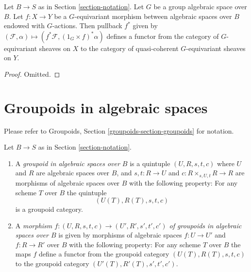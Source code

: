 \begin{lemma}
\label{lemma-pullback-equivariant}
Let $B \to S$ as in Section \ref{section-notation}.
Let $G$ be a group algebraic space over $B$.
Let $f : X \to Y$ be a $G$-equivariant morphism between
algebraic spaces over $B$ endowed with $G$-actions.
Then pullback $f^*$ given by
$(\mathcal{F}, \alpha) \mapsto (f^*\mathcal{F}, (1_G \times f)^*\alpha)$
defines a functor from the category of $G$-equivariant sheaves on
$X$ to the category of quasi-coherent $G$-equivariant sheaves on $Y$.
\end{lemma}

\begin{proof}
Omitted.
\end{proof}





\section{Groupoids in algebraic spaces}
\label{section-groupoids}

\noindent
Please refer to
Groupoids, Section \ref{groupoids-section-groupoids}
for notation.

\begin{definition}
\label{definition-groupoid}
Let $B \to S$ as in Section \ref{section-notation}.
\begin{enumerate}
\item A {\it groupoid in algebraic spaces over $B$} is a
quintuple $(U, R, s, t, c)$ where
$U$ and $R$ are algebraic spaces over $B$, and
$s, t : R \to U$ and $c : R \times_{s, U, t} R \to R$
are morphisms of algebraic spaces over $B$ with the
following property: For any scheme $T$ over $B$ the quintuple
$$
(U(T), R(T), s, t, c)
$$
is a groupoid category.
\item A {\it morphism
$f : (U, R, s, t, c) \to (U', R', s', t', c')$
of groupoids in algebraic spaces over $B$} is given by morphisms
of algebraic spaces $f : U \to U'$ and $f : R \to R'$ over $B$
with the following property:  For any scheme
$T$ over $B$ the maps $f$ define a functor from the
groupoid category $(U(T), R(T), s, t, c)$ to the
groupoid category $(U'(T), R'(T), s', t', c')$.
\end{enumerate}
\end{definition}

